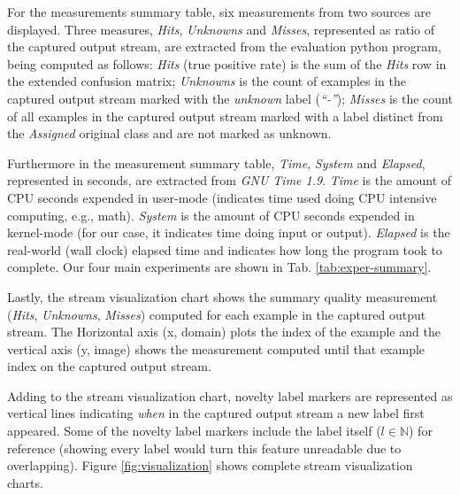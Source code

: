 For the measurements summary table, six measurements from two sources are displayed. Three
measures, \emph{Hits}, \emph{Unknowns} and \emph{Misses}, represented as ratio of
the captured output stream, are extracted from the evaluation python program, being
computed as follows:
\emph{Hits} (true positive rate) is the sum of the \emph{Hits} row in the
extended confusion matrix;
\emph{Unknowns} is the count of examples in the captured output stream marked
with the \emph{unknown} label (\emph{``-''});
\emph{Misses} is the count of all examples in the captured output stream marked
with a label distinct from the \emph{Assigned} original class and are not marked
as unknown.

Furthermore in the measurement summary table, \emph{Time}, \emph{System} and
\emph{Elapsed}, represented in seconds, are extracted from \emph{GNU Time 1.9}.
\emph{Time} is the amount of CPU seconds expended in user-mode
(indicates time used doing CPU intensive computing, e.g., math).
\emph{System} is the amount of CPU seconds expended in kernel-mode
(for our case, it indicates time doing input or output).
\emph{Elapsed} is the real-world (wall clock) elapsed time and
indicates how long the program took to complete.
Our four main experiments are shown in Tab. \ref{tab:exper-summary}.

Lastly, the stream visualization chart shows the summary quality measurement
(\emph{Hits}, \emph{Unknowns}, \emph{Misses})
computed for each example in the captured output stream.
The Horizontal axis (x, domain) plots the index of the example and the
vertical axis (y, image) shows the measurement computed until that example index on the captured
output stream.

Adding to the stream visualization chart, novelty label markers are represented
as vertical lines indicating \emph{when} in the captured output stream a new
label first appeared.
Some of the novelty label markers include the label itself ($l \in \mathbb{N}$)
for reference (showing every label would turn this feature unreadable due
to overlapping).
Figure \ref{fig:visualization} shows complete stream visualization charts.

